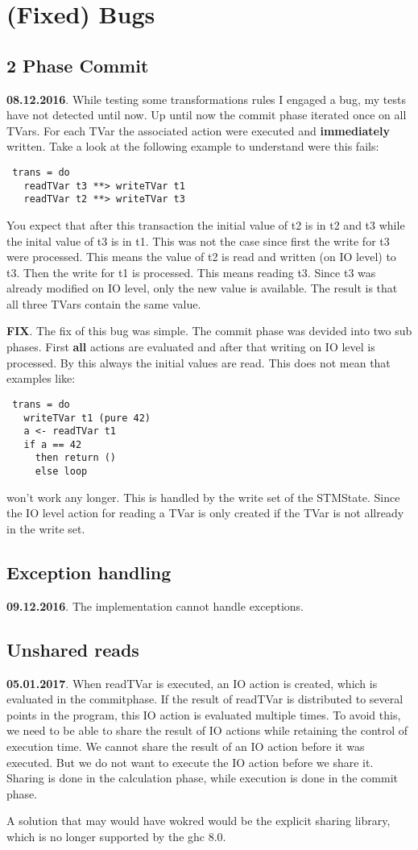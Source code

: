 \documentclass[a4paper,10pt]{article}
\begin{document}
\section{(Fixed) Bugs}
\subsection{2 Phase Commit}
\textbf{08.12.2016}. While testing some transformations rules I engaged a bug, my tests have not detected until now.
Up until now the commit phase iterated once on all TVars. For each TVar the associated action were executed and 
\textbf{immediately} written. Take a look at the following example to understand were this fails:
\begin{lstlisting}
 trans = do
   readTVar t3 **> writeTVar t1
   readTVar t2 **> writeTVar t3
\end{lstlisting}
You expect that after this transaction the initial value of t2 is in t2 and t3 while the inital value of t3 is in t1.
This was not the case since first the write for t3 were processed. This means the value of t2 is read and written (on 
IO level) to t3. Then the write for t1 is processed. This means reading t3. Since t3 was already modified on IO level,
only the new value is available. The result is that all three TVars contain the same value.

\textbf{FIX}. The fix of this bug was simple. The commit phase was devided into two sub phases. First \textbf{all} actions 
are evaluated and after that writing on IO level is processed. By this always the initial values are read. 
This does not mean that examples like:
\begin{lstlisting}
 trans = do 
   writeTVar t1 (pure 42)
   a <- readTVar t1 
   if a == 42 
     then return ()
     else loop
\end{lstlisting}
won't work any longer. This is handled by the write set of the STMState. Since the IO level action for reading a TVar is
only created if the TVar is not allready in the write set.

\subsection{Exception handling}
\textbf{09.12.2016}. The implementation cannot handle exceptions.


\subsection{Unshared reads}
\textbf{05.01.2017}. When readTVar is executed, an IO action is created, which is evaluated in the commitphase. If the result of 
readTVar is distributed to several points in the program, this IO action is evaluated multiple times. To avoid this, we need to be
able to share the result of IO actions while retaining the control of execution time. We cannot share the result of an IO action
before it was executed. But we do not want to execute the IO action before we share it. Sharing is done in the calculation phase,
while execution is done in the commit phase.

A solution that may would have wokred would be the explicit sharing library, which is no longer supported by the ghc 8.0.



\end{document}
